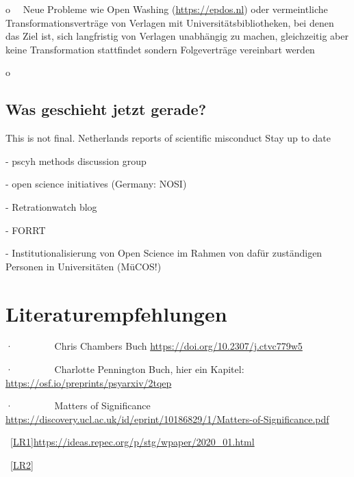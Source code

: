 \documentclass[
  letterpaper,
  DIV=11,
  numbers=noendperiod]{scrreprt}
\begin{document}
o~~ Neue Probleme wie Open Washing (\url{https://epdos.nl}) oder
vermeintliche Transformationsverträge von Verlagen mit
Universitätsbibliotheken, bei denen das Ziel ist, sich langfristig von
Verlagen unabhängig zu machen, gleichzeitig aber keine Transformation
stattfindet sondern Folgeverträge vereinbart werden

o~~ ~

\subsection*{Was geschieht jetzt
gerade?}\label{was-geschieht-jetzt-gerade}

This is not final. Netherlands reports of scientific misconduct Stay up
to date

- pscyh methods discussion group

- open science initiatives (Germany: NOSI)

- Retrationwatch blog

- FORRT

- Institutionalisierung von Open Science im Rahmen von dafür zuständigen
Personen in Universitäten (MüCOS!)

\section*{Literaturempfehlungen}\label{literaturempfehlungen}


·~~~~~~~~ Chris Chambers Buch \url{https://doi.org/10.2307/j.ctvc779w5}

·~~~~~~~~ Charlotte Pennington Buch, hier ein Kapitel:
\url{https://osf.io/preprints/psyarxiv/2tqep}

·~~~~~~~~ Matters of Significance
\url{https://discovery.ucl.ac.uk/id/eprint/10186829/1/Matters-of-Significance.pdf}

~\hyperref[_msoanchor_1]{{[}LR1{]}}\url{https://ideas.repec.org/p/stg/wpaper/2020_01.html}

~\hyperref[_msoanchor_2]{{[}LR2{]}}
\end{document}
